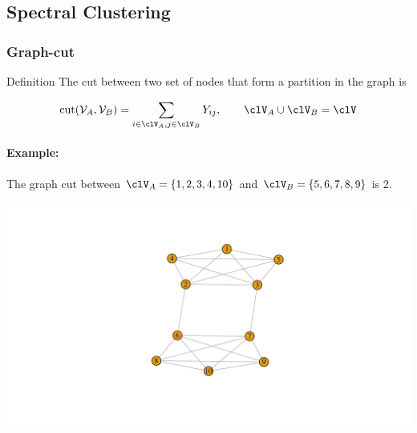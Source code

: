 \documentclass{beamer}\usepackage[]{graphicx}\usepackage[]{color}
\newenvironment{knitrout}{}{} %
\begin{document}
\subsection{Spectral Clustering}

\begin{frame}[fragile]
  \frametitle{Graph-cut}
  
  \begin{block}{Definition}
    The cut between two set of nodes that form a partition in the graph is

$$
\mathrm{cut}(\mathcal{V}_A, \mathcal{V}_B) = \sum_{i\in\clV_A, j\in\clV_B} Y_{ij}, \qquad \clV_A \cup \clV_B = \clV
$$
\end{block}

\paragraph{Example:}
The graph cut between $\clV_A= \{1,2,3,4,10\}$ and $\clV_B= \{5,6,7,8,9\}$ is 2.

\begin{knitrout}\scriptsize
{}\color{fgcolor}
\includegraphics[width=.8\textwidth]{figures/graph-cut-plot-1} 
\end{knitrout}

\end{frame}
\end{document}
